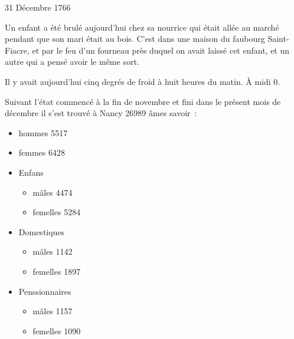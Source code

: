                      \begin{diary}{31 Décembre 1766}{}
                        
                         Un enfant a été brulé aujourd'hui
                           chez sa nourrice qui était allée au marché
                           pendant que son mari était au bois. C’est
                           dans une maison du faubourg
                              Saint-Fiacre,
                           et par le feu d’un fourneau près duquel
                           on avait laissé cet enfant, et un autre
                           qui a pensé avoir le même sort. \bigskip
        
        
                         Il y avait aujourd'hui cinq degrés de
                              froid à huit heures du matin. À midi
                           0. \bigskip
        
        
                         Suivant l’état commencé à la fin de
                              novembre et fini dans le présent mois de
                              décembre il s’est trouvé à Nancy 26989 âmes
                           savoir : \begin{itemize}\item hommes 5517\item femmes 6428\item Enfans \begin{itemize}\item mâles 4474\item femelles 5284\end{itemize}
                                 
                              \item Domestiques
                                 \begin{itemize}\item mâles 1142\item femelles 1897\end{itemize}
                                 
                              \item Penssionnaires \begin{itemize}\item mâles 1157\item femelles 1090\end{itemize}
                              \end{itemize}
                        \bigskip
        
        
                     \end{diary}
                  
            